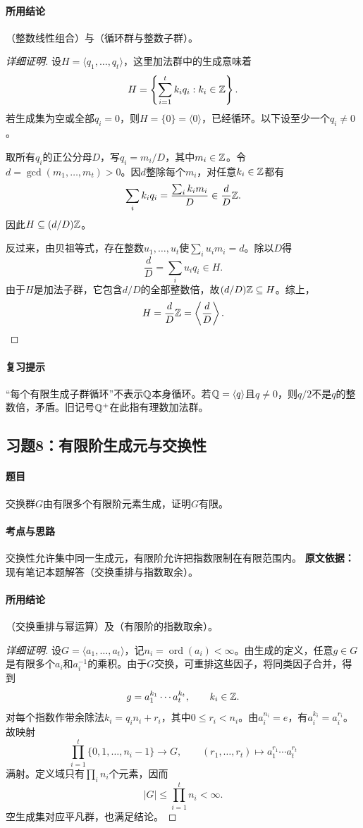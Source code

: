 \paragraph{所用结论}（整数线性组合）与（循环群与整数子群）。
\begin{proof}[详细证明]
设$H=\langle q_1,\ldots,q_t\rangle$，这里加法群中的生成意味着
\[
H=\left\{\sum_{i=1}^t k_iq_i:k_i\in\mathbb Z\right\}.
\]
若生成集为空或全部$q_i=0$，则$H=\{0\}=\langle0\rangle$，已经循环。以下设至少一个$q_i\ne0$。

取所有$q_i$的正公分母$D$，写$q_i=m_i/D$，其中$m_i\in\mathbb Z$。令$d=\gcd(m_1,\ldots,m_t)>0$。因$d$整除每个$m_i$，对任意$k_i\in\mathbb Z$都有
\[
\sum_i k_iq_i=\frac{\sum_i k_im_i}{D}\in\frac dD\mathbb Z.
\]
因此$H\subseteq(d/D)\mathbb Z$。

反过来，由贝祖等式，存在整数$u_1,\ldots,u_t$使$\sum_i u_im_i=d$。除以$D$得
\[
\frac dD=\sum_i u_iq_i\in H.
\]
由于$H$是加法子群，它包含$d/D$的全部整数倍，故$(d/D)\mathbb Z\subseteq H$。综上，
\[
H=\frac dD\mathbb Z=\left\langle\frac dD\right\rangle.
\]
\end{proof}
\paragraph{复习提示}“每个有限生成子群循环”不表示$\mathbb Q$本身循环。若$\mathbb Q=\langle q\rangle$且$q\ne0$，则$q/2$不是$q$的整数倍，矛盾。旧记号$\mathbb Q^+$在此指有理数加法群。

\subsection{习题8：有限阶生成元与交换性}
\paragraph{题目}交换群$G$由有限多个有限阶元素生成，证明$G$有限。
\paragraph{考点与思路}交换性允许集中同一生成元，有限阶允许把指数限制在有限范围内。
\textbf{原文依据：}现有笔记本题解答（交换重排与指数取余）。
\paragraph{所用结论}（交换重排与幂运算）及（有限阶的指数取余）。
\begin{proof}[详细证明]
设$G=\langle a_1,\ldots,a_t\rangle$，记$n_i=\operatorname{ord}(a_i)<\infty$。由生成的定义，任意$g\in G$是有限多个$a_i$和$a_i^{-1}$的乘积。由于$G$交换，可重排这些因子，将同类因子合并，得到
\[
g=a_1^{k_1}\cdots a_t^{k_t},\qquad k_i\in\mathbb Z.
\]
对每个指数作带余除法$k_i=q_in_i+r_i$，其中$0\le r_i<n_i$。由$a_i^{n_i}=e$，有$a_i^{k_i}=a_i^{r_i}$。故映射
\[
\prod_{i=1}^t\{0,1,\ldots,n_i-1\}\longrightarrow G,
\qquad(r_1,\ldots,r_t)\longmapsto a_1^{r_1}\cdots a_t^{r_t}
\]
满射。定义域只有$\prod_i n_i$个元素，因而
\[
|G|\le\prod_{i=1}^t n_i<\infty.
\]
空生成集对应平凡群，也满足结论。
\end{proof}
